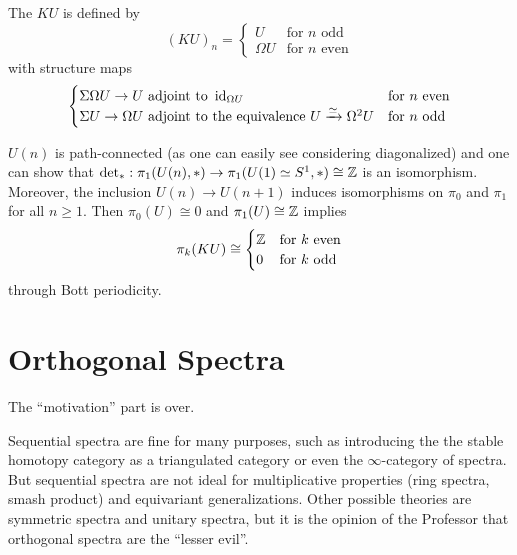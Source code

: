 The  $KU$ is defined by
\[
(KU)_n=\begin{cases} U & \text{for }n\text{ odd} \\ \Omega U & \text{for }n\text{ even}\end{cases}
\]
with structure maps
\[
\begin{cases}
\Sigma\Omega U\to U\text{ adjoint to }\operatorname{id}_{\Omega U} & \text{for }n\text{ even}\\
\Sigma U\to\Omega U\text{ adjoint to the equivalence }U\xrightarrow{\simeq}\Omega^2 U & \text{for }n\text{ odd}
\end{cases}
\]

$U(n)$ is path-connected (as one can easily see considering diagonalized) and one can show that $\operatorname{det}_*:\pi_1(U(n),*)\to\pi_1(U(1)\simeq S^1,*)\cong{\mathbb Z}$ is an isomorphism.
Moreover, the inclusion $U(n)\to U(n+1)$ induces isomorphisms on $\pi_0$ and $\pi_1$ for all $n\geq1$. Then $\pi_0 (U)\cong0$ and $\pi_1 (U)\cong{\mathbb Z}$ implies
\[
\pi_k(KU)\cong\begin{cases} {\mathbb Z} & \text{for }k\text{ even} \\ 0 & \text{for }k\text{ odd}\end{cases}
\]
through Bott periodicity.

\section{Orthogonal Spectra}

The \enquote{motivation} part is over.

Sequential spectra are fine for many purposes, such as introducing the the stable homotopy category as a triangulated category or even the $\infty$-category of spectra. But sequential spectra are not ideal for multiplicative properties (ring spectra, smash product) and equivariant generalizations. Other possible theories are symmetric spectra and unitary spectra, but it is the opinion of the Professor that orthogonal spectra are the \enquote{lesser evil}.

